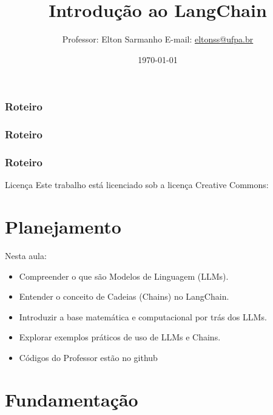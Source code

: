 \documentclass{beamer}
\title[]{Introdução ao LangChain}
\author[Elton Sarmanho]{ 
Professor: Elton Sarmanho\inst{1} 
\newline
E-mail: \href{mailto:eltonss@ufpa.br}{eltonss@ufpa.br}\newline
\href{https://github.com/eltonsarmanho}{\faGithub} \href{https://www.linkedin.com/in/elton-sarmanho-836553185/}{\faLinkedinSquare}\\
\ccbyncsa
}
\institute[UFPA]{
   \inst{1}%
     Faculdade de Sistemas de Informação - UFPA/CUNTINS
     }
\date{\today}
\begin{document}
\begin{frame}
\titlepage
\end{frame}

\begin{frame}
\frametitle{Roteiro}
\tableofcontents[sections={1-3}]
\end{frame}
\begin{frame}
\frametitle{Roteiro}
\tableofcontents[sections={4-6}]
\end{frame}

\begin{frame}
\frametitle{Roteiro}
\tableofcontents[sections={7-8}]
\end{frame}
\begin{frame}{Licença}
    Este trabalho está licenciado sob a licença Creative Commons:

    \bigskip
    \ccbyncsa
\end{frame}

\section{Planejamento}

\begin{frame}
Nesta aula:

\begin{itemize}
     \item Compreender o que são Modelos de Linguagem (LLMs).
    \item Entender o conceito de Cadeias (Chains) no LangChain.
    \item Introduzir a base matemática e computacional por trás dos LLMs.
    \item Explorar exemplos práticos de uso de LLMs e Chains.
 \item Códigos do Professor estão no github
\end{itemize}


\end{frame}
\section{Fundamentação}
\end{document}
